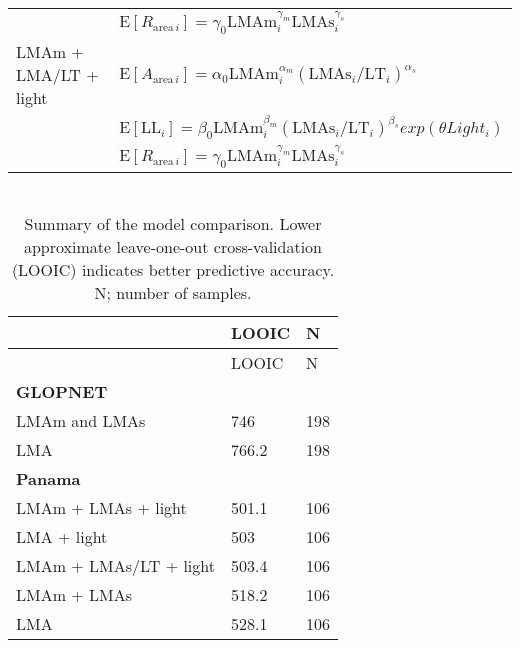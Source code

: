 \documentclass[
  12pt,
]{article}
\begin{document}
\begin{longtable}[]{@{}
  >{\raggedright\arraybackslash}p{}
  >{\raggedright\arraybackslash}p{}@{}}
& \(\mathrm{E}[R_{\mathrm{area} \, i}] = \gamma_0\mathrm{LMAm}_{i}^{\gamma_m} \mathrm{LMAs}_{i}^{\gamma_s}\) \\
LMAm + LMA/LT + light & \(\mathrm{E}[A_{\mathrm{area} \, i}]= \alpha_0\mathrm{LMAm}_{i}^{\alpha_m} (\mathrm{LMAs}_{i}/\mathrm{LT}_{i})^{\alpha_s}\) \\
& \(\mathrm{E}[\mathrm{LL}_i] = \beta_0\mathrm{LMAm}_{i}^{\beta_m} (\mathrm{LMAs}_{i}/\mathrm{LT}_{i})^{\beta_s}exp(\theta Light_i)\) \\
& \(\mathrm{E}[R_{\mathrm{area} \, i}] = \gamma_0\mathrm{LMAm}_{i}^{\gamma_m} \mathrm{LMAs}_{i}^{\gamma_s}\) \\
\bottomrule
\end{longtable}

\newpage

\hypertarget{section}{%
\section{}\label{section}}

\begin{longtable}[]{@{}lll@{}}
\caption{\label{tab:lootab} Summary of the model comparison. Lower approximate leave-one-out cross-validation (LOOIC) indicates better predictive accuracy. N; number of samples.}\tabularnewline
\toprule
& LOOIC & N \\
\midrule
\endfirsthead
\toprule
& LOOIC & N \\
\midrule
\endhead
\textbf{GLOPNET} & & \\
LMAm and LMAs & 746 & 198 \\
LMA & 766.2 & 198 \\
\textbf{Panama} & & \\
LMAm + LMAs + light & 501.1 & 106 \\
LMA + light & 503 & 106 \\
LMAm + LMAs/LT + light & 503.4 & 106 \\
LMAm + LMAs & 518.2 & 106 \\
LMA & 528.1 & 106 \\
\bottomrule
\end{longtable}

\newpage

\hypertarget{section-1}{%
\section{}\label{section-1}}
\end{document}
